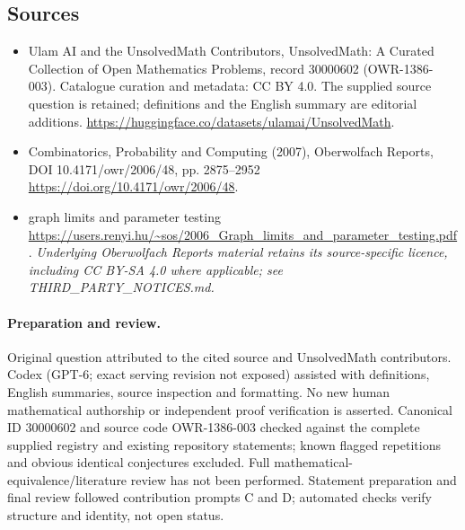 \documentclass[11pt]{article}
\begin{document}
\subsection{Sources}
\begin{itemize}
\item[\hypertarget{source:30000602:1}{S1}] Ulam AI and the UnsolvedMath Contributors, UnsolvedMath: A Curated Collection of Open Mathematics Problems, record 30000602 (OWR-1386-003). Catalogue curation and metadata: CC BY 4.0. The supplied source question is retained; definitions and the English summary are editorial additions.
\url{https://huggingface.co/datasets/ulamai/UnsolvedMath}.
\item[\hypertarget{source:30000602:2}{S2}] Combinatorics, Probability and Computing (2007), Oberwolfach Reports, DOI 10.4171/owr/2006/48, pp. 2875--2952
\url{https://doi.org/10.4171/owr/2006/48}.
\item[\hypertarget{source:30000602:3}{S3}] graph limits and parameter testing
\url{https://users.renyi.hu/~sos/2006_Graph_limits_and_parameter_testing.pdf}.
\textit{Underlying Oberwolfach Reports material retains its source-specific licence, including CC BY-SA 4.0 where applicable; see THIRD\_PARTY\_NOTICES.md.}
\end{itemize}
\paragraph{Preparation and review.}
Original question attributed to the cited source and UnsolvedMath contributors. Codex (GPT-6; exact serving revision not exposed) assisted with definitions, English summaries, source inspection and formatting. No new human mathematical authorship or independent proof verification is asserted. Canonical ID 30000602 and source code OWR-1386-003 checked against the complete supplied registry and existing repository statements; known flagged repetitions and obvious identical conjectures excluded. Full mathematical-equivalence/literature review has not been performed. Statement preparation and final review followed contribution prompts C and D; automated checks verify structure and identity, not open status.
\label{end:30000602}
\end{document}
